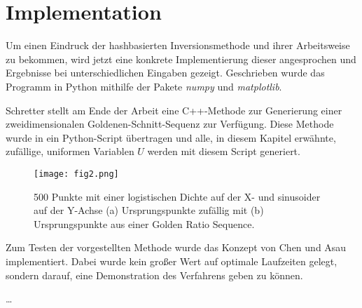 \section{Implementation}
\label{impl}

Um einen Eindruck der hashbasierten Inversionsmethode und ihrer Arbeitsweise zu bekommen, 
wird jetzt eine konkrete Implementierung dieser angesprochen und Ergebnisse bei 
unterschiedlichen Eingaben gezeigt. Geschrieben wurde das Programm in Python mithilfe der 
Pakete \textit{numpy} und \textit{matplotlib}.

Schretter \cite{schretter-golden_ratio_sequences-2012} stellt am Ende der Arbeit eine 
C++-Methode zur Generierung einer zweidimensionalen Goldenen-Schnitt-Sequenz zur Verfügung. 
Diese Methode wurde in ein Python-Script übertragen und alle, in diesem Kapitel erwähnte, zufällige, uniformen
Variablen $U$ werden mit diesem Script generiert.
\begin{figure}
    \centering
    \texttt{[image: fig2.png]}
    \caption{500 Punkte mit einer logistischen Dichte auf der X- und sinusoider auf der Y-Achse 
            (a) Ursprungspunkte zufällig mit  (b) Ursprungspunkte aus einer Golden Ratio Sequence.}
    \label{bild:grs-vs-rnd}
\end{figure}

Zum Testen der vorgestellten Methode wurde das Konzept von Chen und Asau \cite{chen_asau-generating_random_variates-1974} 
implementiert. Dabei wurde kein großer Wert auf optimale Laufzeiten gelegt, sondern darauf, eine Demonstration 
des Verfahrens geben zu können.

\dots


